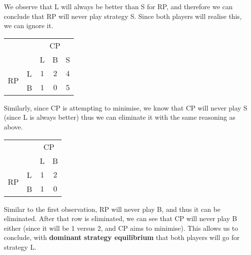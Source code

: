 \documentclass[a4paper, 12pt]{article}
\begin{document}
                We observe that L will always be better than S for RP, and therefore we can conclude that RP will never play strategy S.
                Since both players will realise this, we can ignore it.
                \begin{center}
                    \begin{tabular}{|cc|ccc|}
                        \hline
                        & & \multicolumn{3}{c|}{CP} \\
                        & & L & B & S \\
                        \hline
                        \multirow{2}{*}{RP} & L & $1$ & $2$ & $4$ \\
                        & B & $1$ & $0$ & $5$ \\
                        \hline
                    \end{tabular}
                \end{center}
                Similarly, since CP is attempting to minimise, we know that CP will never play S (since L is always better) thus we can eliminate it with the same reasoning as above.
                \begin{center}
                    \begin{tabular}{|cc|cc|}
                        \hline
                        & & \multicolumn{2}{c|}{CP} \\
                        & & L & B \\
                        \hline
                        \multirow{2}{*}{RP} & L & $1$ & $2$ \\
                        & B & $1$ & $0$ \\
                        \hline
                    \end{tabular}
                \end{center}
                Similar to the first observation, RP will never play B, and thus it can be eliminated.
                After that row is eliminated, we can see that CP will never play B either (since it will be 1 versus 2, and CP aims to minimise).
                This allows us to conclude, with \textbf{dominant strategy equilibrium} that both players will go for strategy L.
\end{document}
